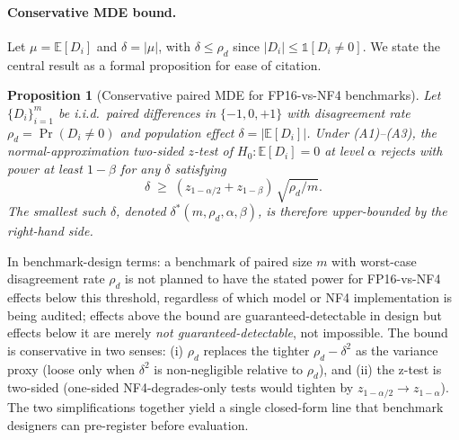 \documentclass{article}
\newtheorem{proposition}{Proposition}
\begin{document}
\paragraph{Conservative MDE bound.}
Let $\mu = \mathbb{E}[D_i]$ and $\delta = |\mu|$, with $\delta \le \rho_d$ since $|D_i| \le \mathbb{1}[D_i\ne 0]$. We state the central result as a formal proposition for ease of citation.

\begin{proposition}[Conservative paired MDE for FP16-vs-NF4 benchmarks]
\label{prop:mde}
Let $\{D_i\}_{i=1}^m$ be i.i.d.\ paired differences in $\{-1, 0, +1\}$ with disagreement rate $\rho_d = \Pr(D_i \ne 0)$ and population effect $\delta = |\mathbb{E}[D_i]|$. Under (A1)--(A3), the normal-approximation two-sided $z$-test of $H_0: \mathbb{E}[D_i]=0$ at level $\alpha$ rejects with power at least $1-\beta$ for any $\delta$ satisfying
\begin{equation*}
    \delta \;\ge\; (z_{1-\alpha/2} + z_{1-\beta})\,\sqrt{\rho_d/m}.
\end{equation*}
The smallest such $\delta$, denoted $\delta^*(m, \rho_d, \alpha, \beta)$, is therefore upper-bounded by the right-hand side.
\end{proposition}

In benchmark-design terms: a benchmark of paired size $m$ with worst-case disagreement rate $\rho_d$ is not planned to have the stated power for FP16-vs-NF4 effects below this threshold, regardless of which model or NF4 implementation is being audited; effects above the bound are guaranteed-detectable in design but effects below it are merely \emph{not guaranteed-detectable}, not impossible. The bound is conservative in two senses: (i) $\rho_d$ replaces the tighter $\rho_d - \delta^2$ as the variance proxy (loose only when $\delta^2$ is non-negligible relative to $\rho_d$), and (ii) the z-test is two-sided (one-sided NF4-degrades-only tests would tighten by $z_{1-\alpha/2}\!\to\!z_{1-\alpha}$). The two simplifications together yield a single closed-form line that benchmark designers can pre-register before evaluation.
\end{document}
